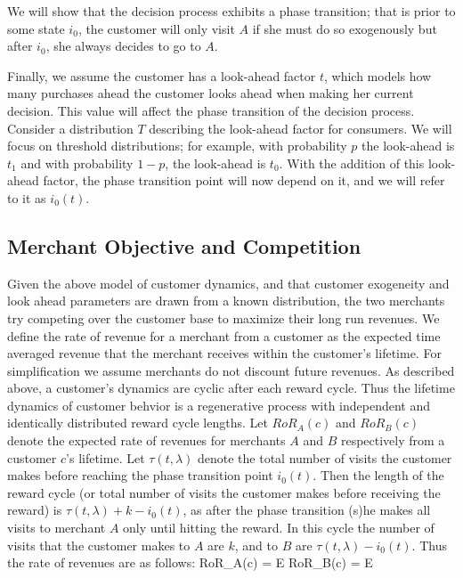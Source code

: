 We will show that the decision process exhibits a phase transition; that is prior to some state $i_0$, the customer will only visit $A$ if she must do so exogenously but after $i_0$, she always decides to go to $A$. 

Finally, we assume the customer has a look-ahead factor $t$, which models how many purchases ahead the customer looks ahead when making her current decision. 
This value will affect the phase transition of the decision process. 
Consider a distribution $T$ describing the look-ahead factor for consumers. 
We will focus on threshold distributions; for example, with probability $p$ the look-ahead is $t_1$ and with probability $1-p$, the look-ahead is $t_0$.
With the addition of this look-ahead factor, the phase transition point will now depend on it, and we will refer to it as $i_0(t)$.

\subsection{Merchant Objective and Competition}
Given the above model of customer dynamics, and that customer exogeneity and look ahead parameters are drawn from a known distribution, the two merchants try competing over the customer base to maximize their long run revenues.
We define the rate of revenue for a merchant from a customer as the expected time averaged revenue that the merchant receives within the customer's lifetime.
For simplification we assume merchants do not discount future revenues.
As described above, a customer's dynamics are cyclic after each reward cycle.
Thus the lifetime dynamics of customer behvior is a regenerative process with independent and identically distributed reward cycle lengths.
Let $RoR_A(c)$ and $RoR_B(c)$ denote the expected rate of revenues for merchants $A$ and $B$ respectively from a customer $c$'s lifetime.
Let $\tau(t, \lambda)$ denote the total number of visits the customer makes before reaching the phase transition point $i_0(t)$.
Then the length of the reward cycle (or total number of visits the customer makes before receiving the reward) is $\tau(t, \lambda) + k - i_0(t)$, as after the phase transition (s)he makes all visits to merchant $A$ only until hitting the reward.
In this cycle the number of visits that the customer makes to $A$ are $k$, and to $B$ are $\tau(t,\lambda) - i_0(t)$.
Thus the rate of revenues are as follows:
\beq
RoR_A(c) = \underset{\tau}E
\eeq
\beq
RoR_B(c) = \underset{\tau}E
\eeq

